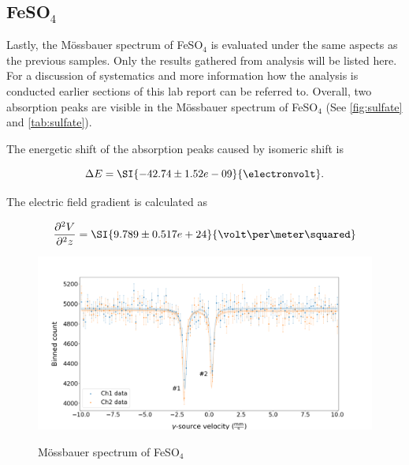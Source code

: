 
\subsection{FeSO$_4$}
\label{ssec:sulfate}

Lastly, the Mössbauer spectrum of FeSO$_4$ is evaluated under the same aspects as the
previous samples. Only the results gathered from analysis will be listed here. For a
discussion of systematics and more information how the analysis is conducted earlier
sections of this lab report can be referred to. Overall, two absorption peaks are
visible in the Mössbauer spectrum of FeSO$_4$ (See \autoref{fig:sulfate} and
\autoref{tab:sulfate}).

The energetic shift of the absorption peaks caused by isomeric shift is

\begin{equation}
\Delta E = \SI{-42.74\pm 1.52e-09}{\electronvolt}.
\end{equation}

The electric field gradient is calculated as

\begin{equation}
\frac{\partial^2 V}{\partial^2 z} = \SI{9.789\pm0.517e+24}{\volt\per\meter\squared}
\end{equation}

\begin{figure}

	\includegraphics[width=1.0\textwidth]{./fig/Sulfate.png}
	\caption{Mössbauer spectrum of FeSO$_4$}{}
	\label{fig:sulfate}
\end{figure}


